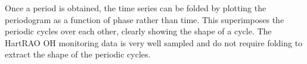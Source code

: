 Once a period is obtained, the time series can be folded by plotting the periodogram as a function of phase rather than time.
This superimposes the periodic cycles over each other, clearly showing the shape of a cycle.
The HartRAO OH monitoring data is very well sampled and do not require folding to extract the shape of the periodic cycles.
